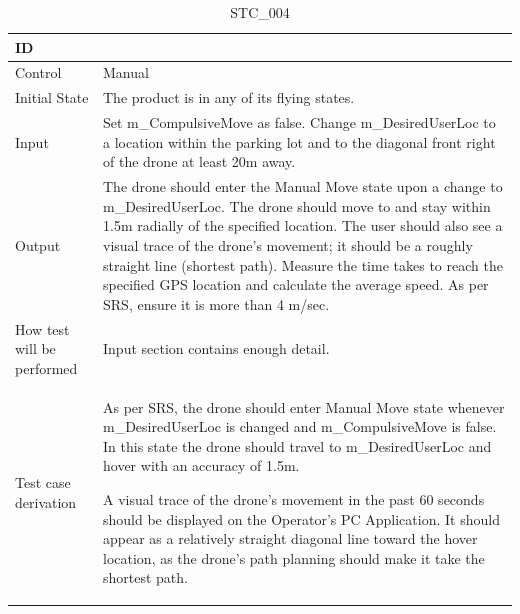 \documentclass[12pt, titlepage]{article}
\begin{document}
\begin{table}[!h]
\begin{center}
\caption {STC\_004}
\label{tab:STC_004}
\begin{tabular}{ | m{3.2cm} | m{12.2cm} | } 
\hline
ID & \nameref{tab:STC_004} \\ 
\hline
Control & Manual \\ 
\hline
Initial State & The product is in any of its flying states.   \\ 
\hline
Input & Set m\_CompulsiveMove as false. Change m\_DesiredUserLoc to a location within the parking lot and to the diagonal front right of the drone at least 20m away.  \\ 
\hline
Output & The drone should enter the Manual Move state upon a change to m\_DesiredUserLoc. The drone should move to and stay within 1.5m radially of the specified location. 
The user should also see a visual trace of the drone's movement; it should be a roughly straight line (shortest path).
Measure the time takes to reach the specified GPS location and calculate the average speed. As per SRS, ensure it is more than 4 m/sec.  \\ 
\hline
How test will be performed & Input section contains enough detail. \\ 
\hline
Test case derivation & As per SRS, the drone should enter Manual Move state whenever m\_DesiredUserLoc is changed and m\_CompulsiveMove is false. In this state the drone should travel to m\_DesiredUserLoc and hover with an accuracy of 1.5m. 

A visual trace of the drone's movement in the past 60 seconds should be displayed on the Operator's PC Application. It should appear as a relatively straight diagonal line toward the hover location, as the drone's path planning should make it take the shortest path. 


\end{tabular}
\end{center}
\end{table}
\end{document}
